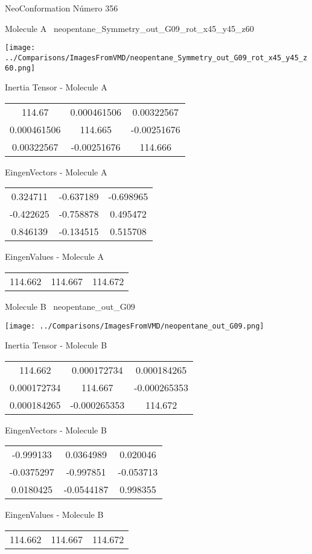\vtab[-3cm]
\begin{center}
{\large NeoConformation \tab Número 356}
\end{center}
\begin{multicols}{2}
\begin{center}

Molecule A \
neopentane\_Symmetry\_out\_G09\_rot\_x45\_y45\_z60

\texttt{[image: ../Comparisons/ImagesFromVMD/neopentane\_Symmetry\_out\_G09\_rot\_x45\_y45\_z60.png]}

Inertia Tensor - Molecule A \\
\begin{tabular}{|c c c|}
114.67	 & 	0.000461506	 & 	0.00322567	 \\
0.000461506	 & 	114.665	 & 	-0.00251676	 \\
0.00322567	 & 	-0.00251676	 & 	114.666
\end{tabular}

\vtab
 EingenVectors - Molecule A     \\
\begin{tabular}{|c c c|}
0.324711	 & 	-0.637189	 & 	-0.698965	 \\
-0.422625	 & 	-0.758878	 & 	0.495472	 \\
0.846139	 & 	-0.134515	 & 	0.515708
\end{tabular}

\vtab
 EingenValues - Molecule A     \\
\begin{tabular}{|c c c|}
114.662	 & 	114.667	 & 	114.672	 \\
\end{tabular}
\columnbreak

Molecule B \
neopentane\_out\_G09

\texttt{[image: ../Comparisons/ImagesFromVMD/neopentane\_out\_G09.png]}

Inertia Tensor - Molecule B \\
\begin{tabular}{|c c c|}
114.662	 & 	0.000172734	 & 	0.000184265	 \\
0.000172734	 & 	114.667	 & 	-0.000265353	 \\
0.000184265	 & 	-0.000265353	 & 	114.672
\end{tabular}

\vtab
 EingenVectors - Molecule B     \\
\begin{tabular}{|c c c|}
-0.999133	 & 	0.0364989	 & 	0.020046	 \\
-0.0375297	 & 	-0.997851	 & 	-0.053713	 \\
0.0180425	 & 	-0.0544187	 & 	0.998355
\end{tabular}

\vtab
 EingenValues - Molecule B     \\
\begin{tabular}{|c c c|}
114.662	 & 	114.667	 & 	114.672	 \\
\end{tabular}

\end{center}
\end{multicols}

